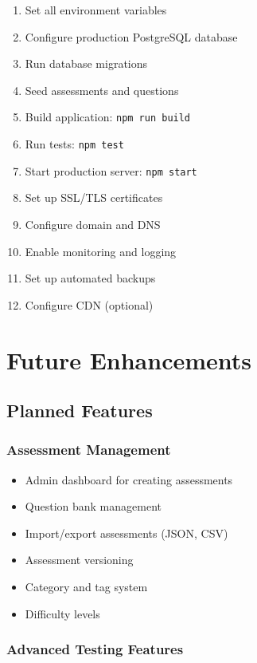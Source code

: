 \documentclass[12pt,a4paper]{report}
\begin{document}
\begin{enumerate}
    \item Set all environment variables
    \item Configure production PostgreSQL database
    \item Run database migrations
    \item Seed assessments and questions
    \item Build application: \texttt{npm run build}
    \item Run tests: \texttt{npm test}
    \item Start production server: \texttt{npm start}
    \item Set up SSL/TLS certificates
    \item Configure domain and DNS
    \item Enable monitoring and logging
    \item Set up automated backups
    \item Configure CDN (optional)
\end{enumerate}

\chapter{Future Enhancements}

\section{Planned Features}

\subsection{Assessment Management}

\begin{itemize}
    \item Admin dashboard for creating assessments
    \item Question bank management
    \item Import/export assessments (JSON, CSV)
    \item Assessment versioning
    \item Category and tag system
    \item Difficulty levels
\end{itemize}

\subsection{Advanced Testing Features}
\end{document}
